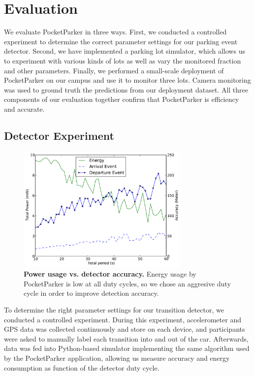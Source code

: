 \section{Evaluation}
\label{sec-evaluation}

We evaluate PocketParker in three ways. First, we conducted a controlled
experiment to determine the correct parameter settings for our parking event
detector. Second, we have implemented a parking lot simulator, which allows
us to experiment with various kinds of lots as well as vary the monitored
fraction and other parameters. Finally, we performed a small-scale deployment
of PocketParker on our campus and use it to monitor three lots. Camera
monitoring was used to ground truth the predictions from our deployment
dataset. All three components of our evaluation together confirm that
PocketParker is efficiency and accurate.

\subsection{Detector Experiment}

\begin{figure}
\centering
\includegraphics[width=3.325in]{./figures/Energy_accuracy.pdf}

\caption{\textbf{Power usage vs. detector accuracy.} Energy usage by
PocketParker is low at all duty cycles, so we chose an aggresive duty cycle
in order to improve detection accuracy.}

\label{fig-energy}
\end{figure}



To determine the right parameter settings for our transition detector, we
conducted a controlled experiment. During this experiment, accelerometer and
GPS data was collected continuously and store on each device, and
participants were asked to manually label each transition into and out of the
car. Afterwards, data was fed into Python-based simulator implementing the
same algorithm used by the PocketParker application, allowing us measure
accuracy and energy consumption as function of the detector duty cycle.

